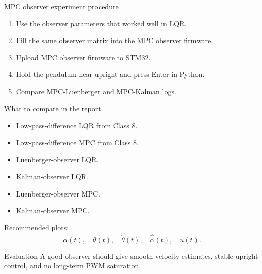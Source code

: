 \documentclass[aspectratio=169]{beamer}
\begin{document}
\begin{frame}{MPC observer experiment procedure}
\begin{enumerate}
    \item Use the observer parameters that worked well in LQR.
    \vspace{0.2cm}
    \item Fill the same observer matrix into the MPC observer firmware.
    \vspace{0.2cm}
    \item Upload MPC observer firmware to STM32.
    \vspace{0.2cm}
    \item Hold the pendulum near upright and press Enter in Python.
    \vspace{0.2cm}
    \item Compare MPC-Luenberger and MPC-Kalman logs.
\end{enumerate}

\vspace{0.2cm}

\end{frame}

\begin{frame}{What to compare in the report}
\begin{itemize}
    \item Low-pass-difference LQR from Class 8.
   
    \item Low-pass-difference MPC from Class 8.
       
    \item Luenberger-observer LQR.

    \item Kalman-observer LQR.
 
    \item Luenberger-observer MPC.
   
    \item Kalman-observer MPC.
\end{itemize}


Recommended plots:
\[
\alpha(t),\quad \theta(t),\quad \widehat{\dot\theta}(t),\quad \widehat{\dot\alpha}(t),\quad u(t).
\]

\begin{block}{Evaluation}
\small
A good observer should give smooth velocity estimates, stable upright control, and no long-term PWM saturation.
\end{block}
\end{frame}
\end{document}

